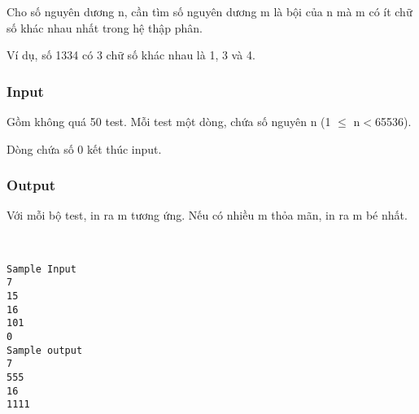 

Cho số nguyên dương n, cần tìm số nguyên dương m là bội của n mà m có ít chữ số khác nhau nhất trong hệ thập phân.

Ví dụ, số 1334 có 3 chữ số khác nhau là 1, 3 và 4.

\subsubsection{Input}

Gồm không quá 50 test. Mỗi test một dòng, chứa số nguyên n (1 $\le$ n$<$65536).


Dòng chứa số 0 kết thúc input. 

\subsubsection{Output}

Với mỗi bộ test, in ra m tương ứng. Nếu có nhiều m thỏa mãn, in ra m bé nhất. 

 
\begin{verbatim}
Sample Input
7 
15 
16 
101 
0
Sample output
7
555
16
1111
       \end{verbatim}

 
